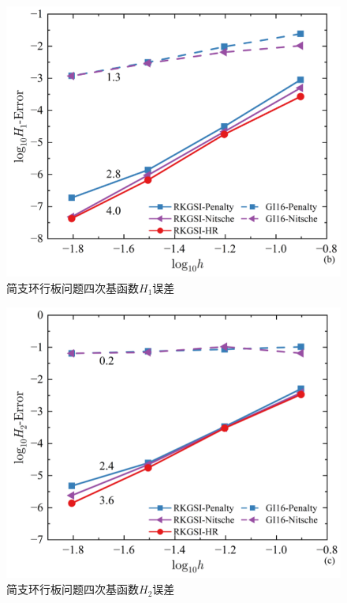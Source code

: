 \begin{figure}[H]
    \centering
    \includegraphics[scale=0.5]{figure/PHR/A/QH1.png}
    \caption{简支环行板问题四次基函数$H_1$误差}
\end{figure}
\newpage
\begin{figure}[H]
    \centering
    \includegraphics[scale=0.5]{figure/PHR/A/QH2.png}
    \caption{简支环行板问题四次基函数$H_2$误差}
\end{figure}
